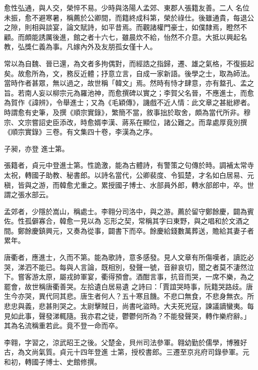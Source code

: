 \begin{pinyinscope}
 愈性弘通，與人交，榮悴不易。少時與洛陽人孟郊、東郡人張籍友善。二人
 名位未振，愈不避寒暑，稱薦於公卿間，而籍終成科第，榮於祿仕。後雖通貴，每退公之隙，則相與談宴，論文賦詩，如平昔焉。而觀諸權門豪士，如僕隸焉，瞪然不顧。而頗能誘厲後進，館之者十六七，雖晨炊不給，怡然不介意。大抵以興起名教，弘獎仁義為事。凡嫁內外及友朋孤女僅十人。



 常以為自魏、晉已還，為文者多拘偶對，而經誥之指歸，遷、雄之氣格，不復振起矣。故愈所為，文，務反近體；抒意立言，自成一家新語。後學之士，取為師法。
 當時作者甚眾，無以過之，故世稱「韓文」焉。然時有恃才肆意，亦有盩孔、孟之旨。若南人妄以柳宗元為羅池神，而愈撰碑以實之；李賀父名晉，不應進士，而愈為賀作《諱辨》，令舉進士；又為《毛穎傳》，譏戲不近人情：此文章之甚紕繆者。時謂愈有史筆，及撰《順宗實錄》，繁簡不當，敘事拙於取舍，頗為當代所非。穆宗、文宗嘗詔史臣添改，時愈婿李漢、蔣系在顯位，諸公難之。而韋處厚竟別撰《順宗實錄》三卷。有文集四十卷，李漢為之序。



 子昶，亦登
 進士第。



 張籍者，貞元中登進士第。性詭激，能為古體詩，有警策之句傳於時。調補太常寺太祝，轉國子助教、秘書郎。以詩名當代，公卿裴度、令狐楚，才名如白居易、元稹，皆與之游，而韓愈尤重之。累授國子博士、水部員外郎，轉水部郎中，卒。世謂之張水部云。



 孟郊者，少隱於嵩山，稱處士。李翱分司洛中，與之游。薦於留守鄭餘慶，闢為賓佐。性孤僻寡合，韓愈一見以為
 忘形之契，常稱其字曰東野，與之唱和於文酒之間。鄭餘慶鎮興元，又奏為從事，闢書下而卒。餘慶給錢數萬葬送，贍給其妻子者累年。



 唐衢者，應進士，久而不第。能為歌詩，意多感發。見人文章有所傷嘆者，讀訖必哭，涕泗不能已。每與人言論，既相別，發聲一號，音辭哀切，聞之者莫不淒然泣下。嘗客游太原，屬戎帥軍宴，衢得預會。酒酣言事，抗音而哭，一席不樂，為之罷會，故世稱唐衢善哭。左拾遺白居易遺
 之詩曰：「賈誼哭時事，阮籍哭路歧。唐生今亦哭，異代同其悲。唐生者何人？五十寒且饑。不悲口無食，不悲身無衣。所悲忠與義，悲甚則哭之。太尉擊賊日，尚書叱盜時。大夫死兇寇，諫議謫蠻夷。每見如此事，聲發涕輒隨。我亦君之徒，鬱鬱何所為？不能發聲哭，轉作樂府辭。」其為名流稱重若此。竟不登一命而卒。



 李翱，字習之，涼武昭王之後。父楚金，貝州司法參軍。翱幼勤於儒學，博雅好古，為文尚氣質。貞元十四年登進
 士第，授校書郎。三遷至京兆府司錄參軍。元和初，轉國子博士、史館修撰。




\end{pinyinscope}

